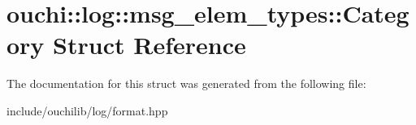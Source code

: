\hypertarget{structouchi_1_1log_1_1msg__elem__types_1_1_category}{}\section{ouchi\+::log\+::msg\+\_\+elem\+\_\+types\+::Category Struct Reference}
\label{structouchi_1_1log_1_1msg__elem__types_1_1_category}


The documentation for this struct was generated from the following file\+:\begin{DoxyCompactItemize}
\item 
include/ouchilib/log/format.\+hpp\end{DoxyCompactItemize}
